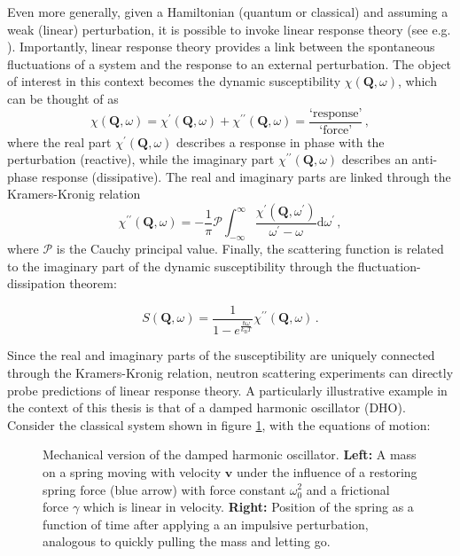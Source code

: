 Even more generally, given a Hamiltonian (quantum or classical) and assuming a weak (linear) perturbation, it is possible to invoke linear response theory (see e.g. \cite[chapter 3]{Jensen1991}). Importantly, linear response theory provides a link between the spontaneous fluctuations of a system and the response to an external perturbation. The object of interest in this context becomes the dynamic susceptibility $\chi(\bm{Q}, \omega)$, which can be thought of as
%
\[ \chi(\bm{Q}, \omega) = \chi^{\prime}(\bm{Q}, \omega) + \chi^{\prime\prime}(\bm{Q}, \omega) = \frac{\text{`response'}}{\text{`force'}} \, , \]
%
where the real part $\chi^{\prime}(\bm{Q}, \omega)$ describes a response in phase with the perturbation (reactive),
while the imaginary part $\chi^{\prime\prime}(\bm{Q}, \omega)$ describes an anti-phase response (dissipative). The real and imaginary parts are linked through the Kramers-Kronig relation
%
\[ \chi^{\prime\prime}(\bm{Q}, \omega) = - \frac{1}{\pi} \mathcal{P} \int_{-\infty}^{\infty} \frac{\chi^{\prime}(\bm{Q},\omega^\prime)}{\omega^\prime - \omega} \mathrm{d}\omega^\prime \, , \]
%
where $\mathcal{P}$ is the Cauchy principal value. Finally, the scattering function is related to the imaginary part of the dynamic susceptibility through the fluctuation-dissipation theorem:

\begin{equation}\label{eq:fluctuation_dissipation_theorem}
S(\bm{Q},\omega) = \frac{1}{1-e^{\frac{\hbar\omega}{k_\text{B}T}}} \chi^{\prime\prime}(\bm{Q}, \omega) \, .
\end{equation}

Since the real and imaginary parts of the susceptibility are uniquely connected through the Kramers-Kronig relation, neutron scattering experiments can directly probe predictions of linear response theory. A particularly illustrative example in the context of this thesis is that of a damped harmonic oscillator (DHO). Consider the classical system shown in figure \ref{fig:dho_chi}, with the equations of motion:

\begin{figure}[]
	\centering
	\hspace{4mm}
	\caption[DHO schematic]{Mechanical version of the damped harmonic oscillator. \textbf{Left:} A mass on a spring moving with velocity $\bm{v}$ under the influence of a restoring spring force (blue arrow) with force constant $\omega_0^2$ and a frictional force $\gamma$ which is linear in velocity. \textbf{Right:} Position of the spring as a function of time after applying a an impulsive perturbation, analogous to quickly pulling the mass and letting go.}
	\label{fig:dho_chi}
\end{figure}

